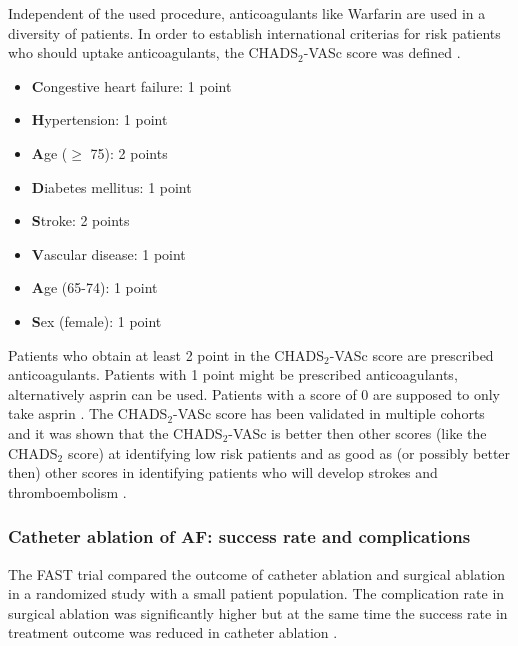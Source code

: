 \documentclass[type=dr, dr=rernat, accentcolor=tud7b,colorbacktitle, bigchapter, openright, twoside, 12pt ]{tudthesis}
\begin{document}




Independent of the used procedure, anticoagulants like Warfarin are used in a diversity of patients. In order to establish international criterias for risk patients who should uptake anticoagulants, the CHADS$_{2}$-VASc score was defined \cite{ESC12}.

\begin{itemize}
 \item [] \textbf{C}ongestive heart failure: 1 point
 \item [] \textbf{H}ypertension: 1 point
 \item [] \textbf{A}ge ($\geq$ 75): 2 points
 \item [] \textbf{D}iabetes mellitus: 1 point
 \item [] \textbf{S}troke: 2 points
 \item [] \textbf{V}ascular disease: 1 point
 \item [] \textbf{A}ge (65-74): 1 point
 \item [] \textbf{S}ex (female): 1 point
\end{itemize}

Patients who obtain at least 2 point in the CHADS$_{2}$-VASc score are prescribed anticoagulants. Patients with 1 point might be prescribed anticoagulants, alternatively asprin can be used. Patients with a score of 0 are supposed to only take asprin \cite{Fle}. The CHADS$_{2}$-VASc score has been validated in multiple cohorts \cite{Lip11} and it was shown that the CHADS$_{2}$-VASc is better then other scores (like the CHADS$_{2}$ score) at identifying low risk patients \cite{Pot12} \cite{Ole12} \cite{Van11} and as good as (or possibly better then) other scores in identifying patients who will develop strokes and thromboembolism \cite{Fri12} \cite{Ole11} \cite{Bor11}. 



\subsubsection*{Catheter ablation of AF: success rate and complications}

The FAST trial compared the outcome of catheter ablation and surgical ablation in a randomized study with a small patient population. 
The complication rate in surgical ablation was significantly higher but at the same time the success rate in treatment outcome was reduced 
in catheter ablation \cite{Boe12}. \newline
\end{document}
